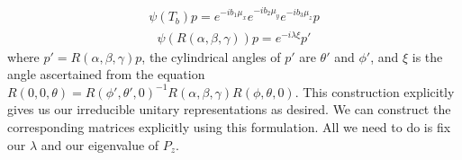\begin{equation}
\begin{aligned}
	\psi(T_b) p = e^{-ib_1\mu_x}e^{-ib_2\mu_y}e^{-ib_3\mu_z}p
\end{aligned}
\end{equation}
\begin{equation}
\begin{aligned}
	\psi(R(\alpha,\beta,\gamma)) p = e^{-i\lambda\xi}p'
\end{aligned}
\end{equation}
where $p' = R(\alpha,\beta,\gamma)p$, the cylindrical angles of $p'$ are $\theta'$ and $\phi'$, and $\xi$ is the angle ascertained from the equation $R(0,0,\theta)=R(\phi',\theta',0)^{-1}R(\alpha,\beta,\gamma) R(\phi,\theta,0)$. This construction explicitly gives us our irreducible unitary representations as desired. We can construct the corresponding matrices explicitly using this formulation. All we need to do is fix our $\lambda$ and our eigenvalue of $P_z$.
